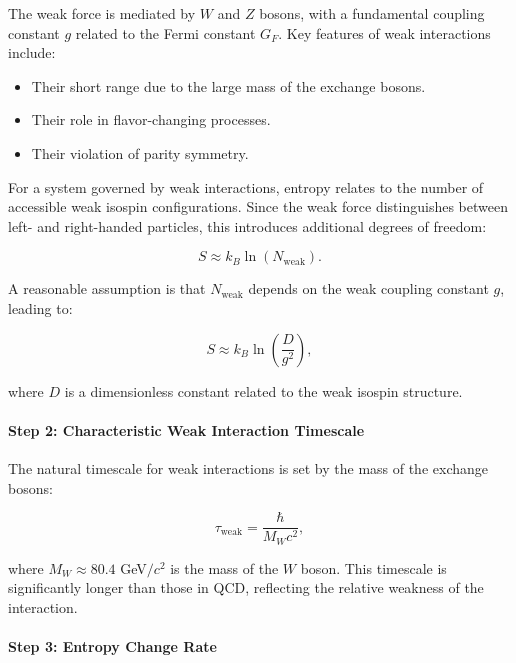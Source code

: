\documentclass[12pt]{article}
\begin{document}
The weak force is mediated by $W$ and $Z$ bosons, with a fundamental coupling constant $g$ related to the Fermi constant $G_F$. Key features of weak interactions include:
\begin{itemize}
    \item Their short range due to the large mass of the exchange bosons.
    \item Their role in flavor-changing processes.
    \item Their violation of parity symmetry.
\end{itemize}

For a system governed by weak interactions, entropy relates to the number of accessible weak isospin configurations. Since the weak force distinguishes between left- and right-handed particles, this introduces additional degrees of freedom:

\begin{equation}
    S \approx k_B \ln(N_{\text{weak}}).
\end{equation}

A reasonable assumption is that $N_{\text{weak}}$ depends on the weak coupling constant $g$, leading to:

\begin{equation}
    S \approx k_B \ln\left(\frac{D}{g^2}\right),
\end{equation}

where $D$ is a dimensionless constant related to the weak isospin structure.

\paragraph{Step 2: Characteristic Weak Interaction Timescale}

The natural timescale for weak interactions is set by the mass of the exchange bosons:

\begin{equation}
    \tau_{\text{weak}} = \frac{\hbar}{M_W c^2},
\end{equation}

where $M_W \approx 80.4$ GeV$/c^2$ is the mass of the $W$ boson. This timescale is significantly longer than those in QCD, reflecting the relative weakness of the interaction.

\paragraph{Step 3: Entropy Change Rate}
\end{document}
